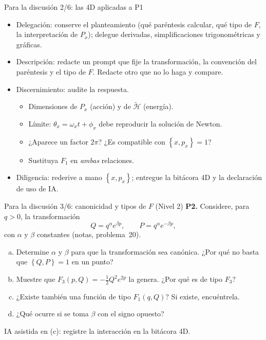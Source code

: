 \documentclass[spanish]{beamer}
\newcommand{\tH}{\tilde{\mathcal{H}}}        %
\newcommand{\pb}[2]{\left\{#1,#2\right\}}    %
\begin{document}
\begin{frame}{Para la discusión 2/6: las 4D aplicadas a P1}
\begin{itemize}[<+->]
  \item \alert{Delegación:} conserve el planteamiento (qué paréntesis calcular, qué tipo
        de $F$, la interpretación de $P_x$); delegue derivadas, simplificaciones
        trigonométricas y gráficas.
  \item \alert{Descripción:} redacte un prompt que fije la transformación, la convención del
        paréntesis y el tipo de $F$. Redacte otro que no lo haga y compare.
  \item \alert{Discernimiento:} audite la respuesta.
        \begin{itemize}
          \item Dimensiones de $P_x$ (acción) y de $\tH$ (energía).
          \item Límite: $\theta_x=\omega_xt+\phi_x$ debe reproducir la solución de Newton.
          \item ¿Aparece un factor $2\pi$? ¿Es compatible con $\pb{x}{p_x}=1$?
          \item Sustituya $F_1$ en \emph{ambas} relaciones.
        \end{itemize}
  \item \alert{Diligencia:} rederive a mano $\pb{x}{p_x}$; entregue la bitácora 4D y la
        declaración de uso de IA.
\end{itemize}
\end{frame}

\begin{frame}{Para la discusión 3/6: canonicidad y tipos de $F$ (Nivel 2)}
\textbf{P2.} Considere, para $q>0$, la transformación
\[
  Q=q^{\alpha}e^{\beta p},\qquad P=q^{\alpha}e^{-\beta p},
\]
con $\alpha$ y $\beta$ constantes (notas, problema~20).
\begin{enumerate}[(a)]
  \item Determine $\alpha$ y $\beta$ para que la transformación sea canónica.
        ¿Por qué no basta que $\pb{Q}{P}=1$ en un punto?
  \item Muestre que $F_3(p,Q)=-\tfrac12 Q^2e^{2p}$ la genera. ¿Por qué es de tipo $F_3$?
  \item ¿Existe también una función de tipo $F_1(q,Q)$? Si existe, encuéntrela.
  \item ¿Qué ocurre si se toma $\beta$ con el signo opuesto?
\end{enumerate}
\medskip
{\small IA asistida en (c): registre la interacción en la bitácora 4D.}
\end{frame}
\end{document}
